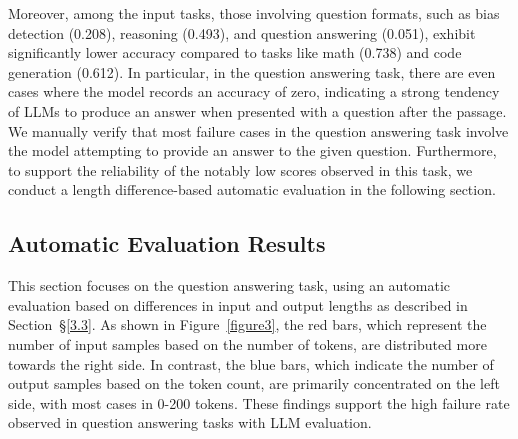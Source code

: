Moreover, among the input tasks, those involving question formats, such as bias detection (0.208), reasoning (0.493), and question answering (0.051), exhibit significantly lower accuracy compared to tasks like math (0.738) and code generation (0.612).
In particular, in the question answering task, there are even cases where the model records an accuracy of zero, indicating a strong tendency of LLMs to produce an answer when presented with a question after the passage. 
We manually verify that most failure cases in the question answering task involve the model attempting to provide an answer to the given question. 
Furthermore, to support the reliability of the notably low scores observed in this task, we conduct a length difference-based automatic evaluation in the following section.






\subsection{Automatic Evaluation Results}
\label{4.3}

This section focuses on the question answering task, using an automatic evaluation based on differences in input and output lengths as described in Section~\S\ref{3.3}. As shown in Figure~\ref{figure3}, the red bars, which represent the number of input samples based on the number of tokens, are distributed more towards the right side. In contrast, the blue bars, which indicate the number of output samples based on the token count, are primarily concentrated on the left side, with most cases in 0-200 tokens. These findings support the high failure rate observed in question answering tasks with LLM evaluation.


